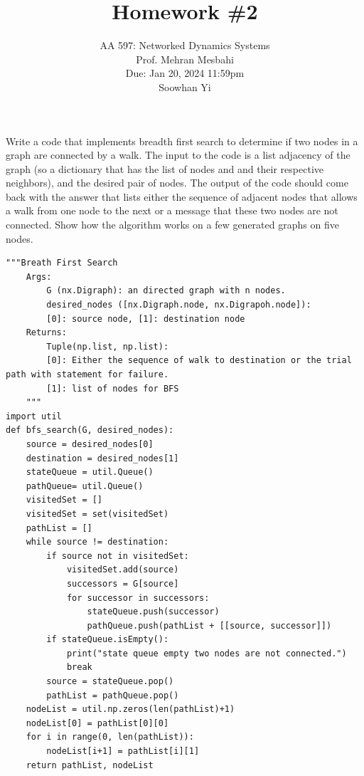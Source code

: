 \documentclass{article}
\begin{document}
\setcounter{problem}{0}
\title{Homework \#2}
\author{
    \normalsize{AA 597: Networked Dynamics Systems}\\
    \normalsize{Prof. Mehran Mesbahi}\\
    \normalsize{Due: Jan 20, 2024 11:59pm}\\
    \normalsize{Soowhan Yi}
}
\date{{}}
\maketitle

\begin{problem}
    Write a code that implements breadth first search to determine if two nodes in a graph are connected by a walk. The input to the code is a list adjacency of the graph (so a dictionary that has the list of nodes and and their respective neighbors), and the desired pair of nodes. The output of the code should come back with the answer that lists either the sequence of adjacent nodes that allows a walk from one node to the next or a message that these two nodes are not connected.  Show how the algorithm works on a few generated graphs on five nodes.
\begin{verbatim}
"""Breath First Search
    Args:
        G (nx.Digraph): an directed graph with n nodes. 
        desired_nodes ([nx.Digraph.node, nx.Digrapoh.node]):  
        [0]: source node, [1]: destination node
    Returns:
        Tuple(np.list, np.list):
        [0]: Either the sequence of walk to destination or the trial path with statement for failure. 
        [1]: list of nodes for BFS
    """
import util
def bfs_search(G, desired_nodes):
    source = desired_nodes[0]
    destination = desired_nodes[1]
    stateQueue = util.Queue()
    pathQueue= util.Queue()
    visitedSet = []
    visitedSet = set(visitedSet)
    pathList = []
    while source != destination:
        if source not in visitedSet:       
            visitedSet.add(source)
            successors = G[source]
            for successor in successors:
                stateQueue.push(successor)
                pathQueue.push(pathList + [[source, successor]])
        if stateQueue.isEmpty(): 
            print("state queue empty two nodes are not connected.")
            break
        source = stateQueue.pop()
        pathList = pathQueue.pop()
    nodeList = util.np.zeros(len(pathList)+1)
    nodeList[0] = pathList[0][0]
    for i in range(0, len(pathList)):
        nodeList[i+1] = pathList[i][1]
    return pathList, nodeList    
\end{verbatim}

\end{problem}
\end{document}
